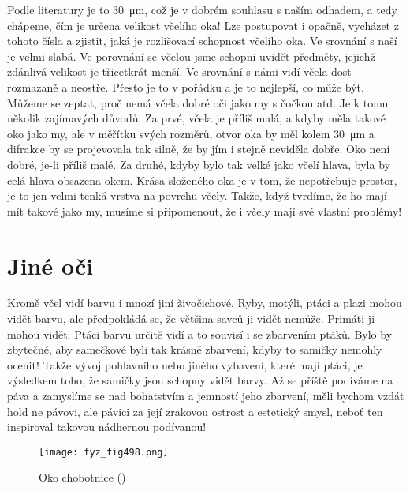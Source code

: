     Podle literatury je to \SI{30}{\micro\m}, což je v dobrém souhlasu s naším odhadem, a tedy
    chápeme, čím je určena velikost včelího oka! Lze postupovat i opačně, vycházet z tohoto čísla a
    zjistit, jaká je rozlišovací schopnost včelího oka. Ve srovnání s naší je velmi slabá. Ve
    porovnání se včelou jsme schopni uvidět předměty, jejichž zdánlivá velikost je třicetkrát menší.
    Ve srovnání s námi vidí včela dost rozmazaně a neostře. Přesto je to v pořádku a je to nejlepší,
    co může být. Můžeme se zeptat, proč nemá včela dobré oči jako my s čočkou atd. Je k tomu několik
    zajímavých důvodů. Za prvé, včela je příliš malá, a kdyby měla takové oko jako my, ale v měřítku
    svých rozměrů, otvor oka by měl kolem \SI{30}{\micro\m} a difrakce by se projevovala tak silně,
    že by jím i stejně neviděla dobře. Oko není dobré, je-li příliš malé. Za druhé, kdyby bylo tak
    velké jako včelí hlava, byla by celá hlava obsazena okem. Krása složeného oka je v tom, že
    nepotřebuje prostor, je to jen velmi tenká vrstva na povrchu včely. Takže, když tvrdíme, že ho
    mají mít takové jako my, musíme si připomenout, že i včely mají své vlastní problémy!

  \section{Jiné oči}\label{fyz:IchapXXXVIsecV}
    Kromě včel vidí barvu i mnozí jiní živočichové. Ryby, motýli, ptáci a plazi mohou vidět barvu,
    ale předpokládá se, že většina savců ji vidět nemůže. Primáti ji mohou vidět. Ptáci barvu určitě
    vidí a to souvisí i se zbarvením ptáků. Bylo by zbytečné, aby samečkové byli tak krásně
    zbarvení, kdyby to samičky nemohly ocenit! Takže vývoj pohlavního nebo jiného vybavení, které
    mají ptáci, je výsledkem toho, že samičky jsou schopny vidět barvy. Až se příště podíváme na
    páva a zamyslíme se nad bohatstvím a jemností jeho zbarvení, měli bychom vzdát hold ne pávovi,
    ale pávici za její zrakovou ostrost a estetický smysl, neboť ten inspiroval takovou nádhernou
    podívanou!

    \begin{figure}[ht!] %
      \centering
      \texttt{[image: fyz\_fig498.png]}
      \caption{Oko chobotnice (\cite[s.~697]{Feynman01})}
      \label{fyz:fig498}
    \end{figure}

